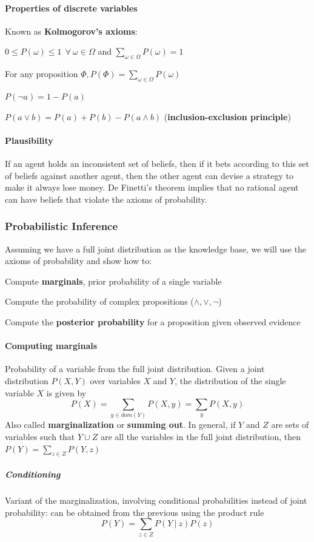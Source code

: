 \documentclass[10pt]{report}
\begin{document}
\paragraph{Properties of discrete variables} Known as \textbf{Kolmogorov's axioms}:
\begin{list}{}{}
	\item $0\leq P(\omega)\leq 1\:\:\forall\:\omega\in\Omega$ and $\sum_{\omega\in\Omega}P(\omega)=1$
	\item For any proposition $\Phi,P(\Phi)=\sum_{\omega\in\Omega}P(\omega)$
	\item $P(\neg a)=1-P(a)$
	\item $P(a\vee b) = P(a) + P(b) - P(a\wedge b)$ (\textbf{inclusion-exclusion principle})
\end{list}
\paragraph{Plausibility} If an agent holds an inconsistent set of beliefs, then if it bets according to this set of beliefs against another agent, then the other agent can devise a strategy to make it always lose money. De Finetti's theorem implies that no rational agent can have beliefs that violate the axioms of probability.
\subsubsection{Probabilistic Inference} Assuming we have a full joint distribution as the knowledge base, we will use the axioms of probability and show how to:
\begin{list}{}{}
	\item Compute \textbf{marginals}, prior probability of a single variable
	\item Compute the probability of complex propositions ($\wedge,\vee,\neg$)
	\item Compute the \textbf{posterior probability} for a proposition given observed evidence
\end{list}
\paragraph{Computing marginals} Probability of a variable from the full joint distribution. Given a joint distribution $P(X,Y)$ over variables $X$ and $Y$, the distribution of the single variable $X$ is given by $$P(X) = \sum_{y\in dom(Y)}P(X,y) = \sum_y P(X,y)$$
Also called \textbf{marginalization} or \textbf{summing out}. In general, if $Y$ and $Z$ are sets of variables such that $Y\cup Z$ are all the variables in the full joint distribution, then $P(Y) = \sum_{z\in Z}P(Y,z)$
\subparagraph{Conditioning} Variant of the marginalization, involving conditional probabilities instead of joint probability: can be obtained from the previous using the product rule $$P(Y) = \sum_{z\in Z} P(Y\:|\:z)P(z)$$
\end{document}
